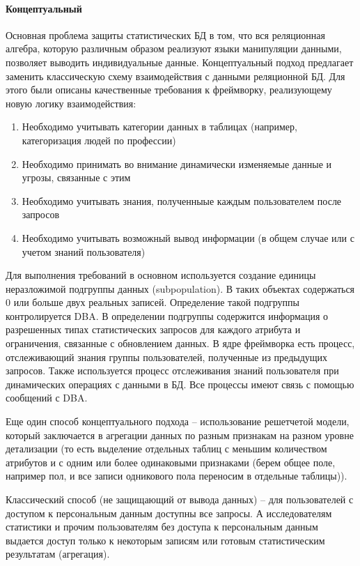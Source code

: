 \paragraph{Концептуальный}

Основная проблема защиты статистических БД в том, что вся реляционная алгебра, которую различным образом реализуют языки манипуляции данными, позволяет выводить индивидуальные данные. Концептуальный подход предлагает заменить классическую схему взаимодействия с данными реляционной БД. Для этого были описаны качественные требования к фреймворку, реализующему новую логику взаимодействия:
\begin{enumerate}
  \item Необходимо учитывать категории данных в таблицах (например, категоризация людей по профессии)
  \item Необходимо принимать во внимание динамически изменяемые данные и угрозы, связанные с этим
  \item Необходимо учитывать знания, полученныые каждым пользователем после запросов
  \item Необходимо учитывать возможный вывод информации (в общем случае или с учетом знаний пользователя)
\end{enumerate}

Для выполнения требований в основном используется создание единицы неразложимой подгруппы данных (subpopulation). В таких объектах содержаться 0 или больше двух реальных записей. Определение такой подгруппы контролируется DBA. В определении подгруппы содержится информация о разрешенных типах статистических запросов для каждого атрибута и ограничения, связанные с обновлением данных. В ядре фреймворка есть процесс, отслеживающий знания группы пользователей, полученные из предыдущих запросов. Также используется процесс отслеживания знаний пользователя при динамических операциях с данными в БД. Все процессы имеют связь с помощью сообщений с DBA.

Еще один способ концептуального подхода -- использование решетчетой модели, который заключается в агрегации данных по разным признакам на разном уровне детализации (то есть выделение отдельных таблиц с меньшим количеством атрибутов и с одним или более одинаковыми признаками (берем общее поле, например пол, и все записи одникового пола переносим в отдельные таблицы)).

Классический способ (не защищающий от вывода данных) -- для пользователей с доступом к персональным данным доступны все запросы. А исследователям статистики и прочим пользователям без доступа к персональным данным выдается доступ только к некоторым записям или готовым статистическим результатам (агрегация).

